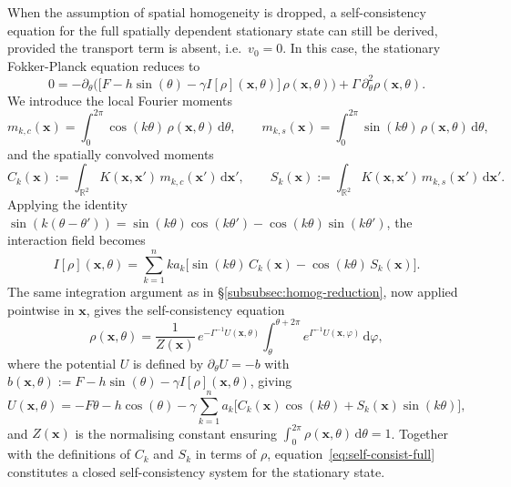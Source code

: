 \documentclass[a4paper,11pt]{article}
\theoremstyle{plain}
\theoremstyle{definition}
\theoremstyle{remark}
\newcommand{\R}{\mathbb{R}}
\newcommand{\dd}{\,\mathrm{d}}
\newcommand{\bx}{\mathbf{x}}
\begin{document}
When the assumption of spatial homogeneity is dropped, a self-consistency equation for the full spatially dependent stationary state can still be derived, provided the transport term is absent, i.e.\ $v_0 = 0$. In this case, the stationary Fokker-Planck equation reduces to
\begin{equation*}\label{eq:stat-v0}
    0 = -\partial_\theta\Big(\big[F - h\sin(\theta) - \gamma I[\rho](\bx,\theta)\big]\,\rho(\bx,\theta)\Big) + \Gamma\,\partial_\theta^2 \rho(\bx,\theta).
\end{equation*}
We introduce the local Fourier moments
\[
    m_{k,c}(\bx) = \int_0^{2\pi} \cos(k\theta)\,\rho(\bx,\theta)\dd\theta, \qquad m_{k,s}(\bx) = \int_0^{2\pi} \sin(k\theta)\,\rho(\bx,\theta)\dd\theta,
\]
and the spatially convolved moments
\[
    C_k(\bx) := \int_{\R^2} K(\bx,\bx')\, m_{k,c}(\bx')\dd\bx', \qquad S_k(\bx) := \int_{\R^2} K(\bx,\bx')\, m_{k,s}(\bx')\dd\bx'.
\]
Applying the identity $\sin(k(\theta-\theta')) = \sin(k\theta)\cos(k\theta') - \cos(k\theta)\sin(k\theta')$, the interaction field becomes
\begin{equation*}\label{eq:I-fourier}
    I[\rho](\bx,\theta) = \sum_{k=1}^n k a_k \big[\sin(k\theta)\,C_k(\bx) - \cos(k\theta)\,S_k(\bx)\big].
\end{equation*}
The same integration argument as in \S\ref{subsubsec:homog-reduction}, now applied pointwise in $\bx$, gives the self-consistency equation
\begin{equation}\label{eq:self-consist-full}
    \rho(\bx,\theta) = \frac{1}{Z(\bx)}\,e^{-\Gamma^{-1} U(\bx,\theta)} \int_\theta^{\theta+2\pi} e^{\Gamma^{-1} U(\bx,\varphi)}\dd\varphi,
\end{equation}
where the potential $U$ is defined by $\partial_\theta U = -b$ with $b(\bx,\theta) := F - h\sin(\theta) - \gamma I[\rho](\bx,\theta)$, giving
\begin{equation*}\label{eq:potential-U}
    U(\bx,\theta) = -F\theta - h\cos(\theta) - \gamma\sum_{k=1}^n a_k\big[C_k(\bx)\cos(k\theta) + S_k(\bx)\sin(k\theta)\big],
\end{equation*}
and $Z(\bx)$ is the normalising constant ensuring $\int_0^{2\pi}\rho(\bx,\theta)\dd\theta = 1$. Together with the definitions of $C_k$ and $S_k$ in terms of $\rho$, equation~\eqref{eq:self-consist-full} constitutes a closed self-consistency system for the stationary state.
\end{document}
